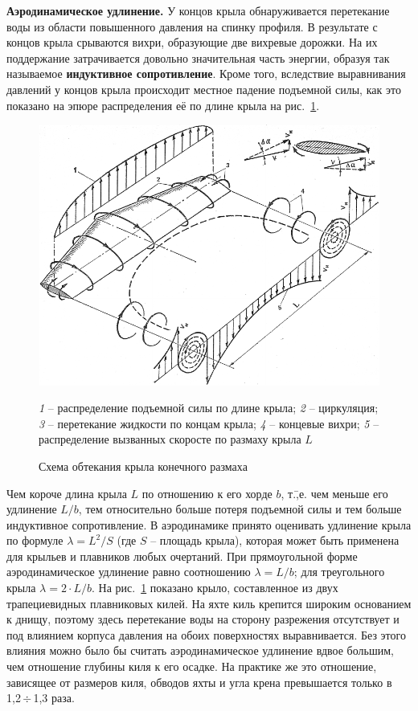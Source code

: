 \documentclass[a4paper, 12pt, twoside, final, book, russian, fittopage, cyremdash]{ncc}
\newcommand{\otdo}{\,\ensuremath{\div}\,}
\newcommand{\ris}[1]{\ref{fig:#1}}
\begin{document}
\textbf{Аэродинамическое удлинение.} У концов крыла обнаруживается перетекание воды из области повышенного давления на спинку профиля. В результате с концов крыла срываются вихри, образующие две вихревые дорожки. На их поддержание затрачивается довольно значительная часть энергии, образуя так называемое \textbf{индуктивное сопротивление}. Кроме того, вследствие выравнивания давлений у концов крыла происходит местное падение подъемной силы, как это показано на эпюре распределения её по длине крыла на рис.~\ris{10}. 

\begin{figure}[htb]
  \centering
  \includegraphics[scale=1.3]{0010P.pdf}
  \caption{Схема обтекания крыла конечного размаха}
  \label{fig:10}
  \centering
  \small
  \textit{1} \--- распределение подъемной силы по длине крыла;
  \textit{2} \--- циркуляция;
  \textit{3} \--- перетекание жидкости по концам крыла;
  \textit{4} \--- концевые вихри;
  \textit{5} \--- распределение вызванных скоросте по размаху крыла $L$
\end{figure}

Чем короче длина крыла $L$ по отношению к его хорде $b$, т.\=,е. чем меньше его удлинение $L/b$, тем относительно больше потеря подъемной силы и тем больше индуктивное сопротивление. В аэродинамике принято оценивать удлинение крыла по формуле $\lambda = L^2/S$ (где $S$ \--- площадь крыла), которая может быть применена для крыльев и плавников любых очертаний. При прямоугольной форме аэродинамическое удлинение равно соотношению $\lambda = L / b$; для треугольного крыла $\lambda = 2 \cdot L / b$.
На рис.~\ris{10} показано крыло, составленное из двух трапециевидных плавниковых килей. На яхте киль крепится широким основанием к днищу, поэтому здесь перетекание воды на сторону разрежения отсутствует и под влиянием корпуса давления на обоих поверхностях выравнивается. Без этого влияния можно было бы считать аэродинамическое удлинение вдвое большим, чем отношение глубины киля к его осадке. На практике же это отношение, зависящее от размеров киля, обводов яхты и угла крена превышается только в 1,2\otdo 1,3 раза.
\end{document}
